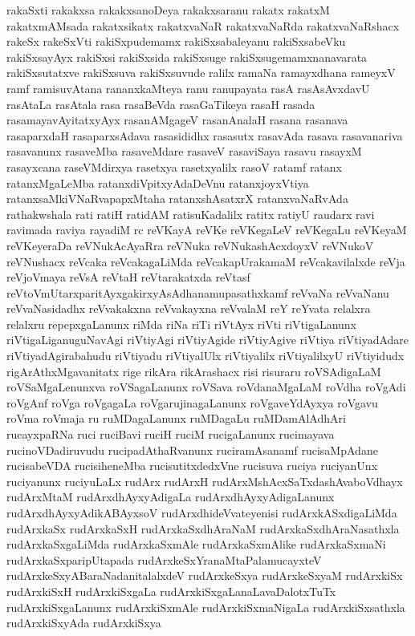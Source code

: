 {rakaSxti
rakakxsa
rakakxsanoDeya
rakakxsaranu
rakatx
rakatxM
rakatxmAMsada
rakatxsikatx
rakatxvaNaR
rakatxvaNaRda
rakatxvaNaRshacx
rakeSx
rakeSxVti
rakiSxpudemamx
rakiSxsabaleyanu
rakiSxsabeVku
rakiSxsayAyx
rakiSxsi
rakiSxsida
rakiSxsuge
rakiSxsugemamxnanavarata
rakiSxsutatxve
rakiSxsuva
rakiSxsuvude
ralilx
ramaNa
ramayxdhana
rameyxV
ramf
ramisuvAtana
rananxkaMteya
ranu
ranupayata
rasA
rasAsAvxdavU
rasAtaLa
rasAtala
rasa
rasaBeVda
rasaGaTikeya
rasaH
rasada
rasamayavAyitatxyAyx
rasanAMgageV
rasanAnalaH
rasana
rasanava
rasaparxdaH
rasaparxsAdava
rasasididhx
rasasutx
rasavAda
rasava
rasavanariva
rasavanunx
rasaveMba
rasaveMdare
rasaveV
rasaviSaya
rasavu
rasayxM
rasayxcana
raseVMdirxya
rasetxya
rasetxyalilx
rasoV
ratamf
ratanx
ratanxMgaLeMba
ratanxdiVpitxyAdaDeVnu
ratanxjoyxVtiya
ratanxsaMkiVNaRvapapxMtaha
ratanxshAsatxrX
ratanxvaNaRvAda
rathakwshala
rati
ratiH
ratidAM
ratisuKadalilx
ratitx
ratiyU
raudarx
ravi
ravimada
raviya
rayadiM
rc
reVKayA
reVKe
reVKegaLeV
reVKegaLu
reVKeyaM
reVKeyeraDa
reVNukAcAyaRra
reVNuka
reVNukashAcxdoyxV
reVNukoV
reVNushacx
reVcaka
reVcakagaLiMda
reVcakapUrakamaM
reVcakavilalxde
reVja
reVjoVmaya
reVsA
reVtaH
reVtarakatxda
reVtasf
reVtoVmUtarxparitAyxgakirxyAsAdhanamupasathxkamf
reVvaNa
reVvaNanu
reVvaNasidadhx
reVvakakxna
reVvakayxna
reVvalaM
reY
reYvata
relalxra
relalxru
repepxgaLanunx
riMda
riNa
riTi
riVtAyx
riVti
riVtigaLanunx
riVtigaLiganuguNavAgi
riVtiyAgi
riVtiyAgide
riVtiyAgive
riVtiya
riVtiyadAdare
riVtiyadAgirabahudu
riVtiyadu
riVtiyalUlx
riVtiyalilx
riVtiyalilxyU
riVtiyidudx
rigArAthxMgavanitatx
rige
rikAra
rikArashacx
risi
risuraru
roVSAdigaLaM
roVSaMgaLenunxva
roVSagaLanunx
roVSava
roVdanaMgaLaM
roVdha
roVgAdi
roVgAnf
roVga
roVgagaLa
roVgarujinagaLanunx
roVgaveYdAyxya
roVgavu
roVma
roVmaja
ru
ruMDagaLanunx
ruMDagaLu
ruMDamAlAdhAri
rucayxpaRNa
ruci
ruciBavi
ruciH
ruciM
rucigaLanunx
rucimayava
rucinoVDadiruvudu
rucipadAthaRvanunx
ruciramAsanamf
rucisaMpAdane
rucisabeVDA
rucisiheneMba
rucisutitxdedxVne
rucisuva
ruciya
ruciyanUnx
ruciyanunx
ruciyuLaLx
rudArx
rudArxH
rudArxMshAcxSaTxdashAvaboVdhayx
rudArxMtaM
rudArxdhAyxyAdigaLa
rudArxdhAyxyAdigaLanunx
rudArxdhAyxyAdikABAyxsoV
rudArxdhideVvateyenisi
rudArxkASxdigaLiMda
rudArxkaSx
rudArxkaSxH
rudArxkaSxdhAraNaM
rudArxkaSxdhAraNasathxla
rudArxkaSxgaLiMda
rudArxkaSxmAle
rudArxkaSxmAlike
rudArxkaSxmaNi
rudArxkaSxparipUtapada
rudArxkeSxYranaMtaPalamucayxteV
rudArxkeSxyABaraNadanitalalxdeV
rudArxkeSxya
rudArxkeSxyaM
rudArxkiSx
rudArxkiSxH
rudArxkiSxgaLa
rudArxkiSxgaLanaLavaDalotxTuTx
rudArxkiSxgaLanunx
rudArxkiSxmAle
rudArxkiSxmaNigaLa
rudArxkiSxsathxla
rudArxkiSxyAda
rudArxkiSxya
}
